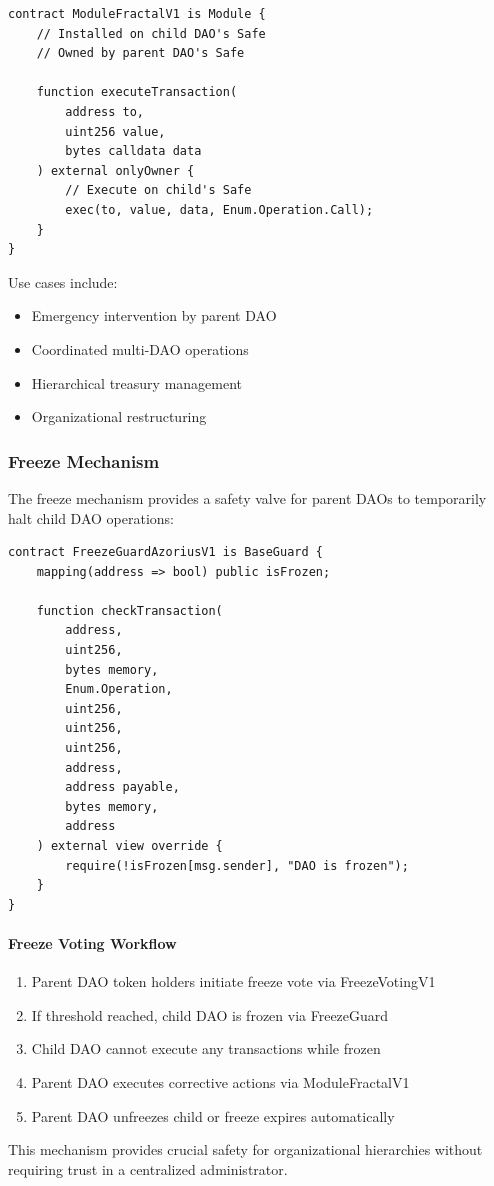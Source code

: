 \begin{lstlisting}[caption=Parent-Child Relationship]
contract ModuleFractalV1 is Module {
    // Installed on child DAO's Safe
    // Owned by parent DAO's Safe

    function executeTransaction(
        address to,
        uint256 value,
        bytes calldata data
    ) external onlyOwner {
        // Execute on child's Safe
        exec(to, value, data, Enum.Operation.Call);
    }
}
\end{lstlisting}

Use cases include:
\begin{itemize}
    \item Emergency intervention by parent DAO
    \item Coordinated multi-DAO operations
    \item Hierarchical treasury management
    \item Organizational restructuring
\end{itemize}

\subsubsection{Freeze Mechanism}

The freeze mechanism provides a safety valve for parent DAOs to temporarily halt child DAO operations:

\begin{lstlisting}[caption=Freeze Guard Architecture]
contract FreezeGuardAzoriusV1 is BaseGuard {
    mapping(address => bool) public isFrozen;

    function checkTransaction(
        address,
        uint256,
        bytes memory,
        Enum.Operation,
        uint256,
        uint256,
        uint256,
        address,
        address payable,
        bytes memory,
        address
    ) external view override {
        require(!isFrozen[msg.sender], "DAO is frozen");
    }
}
\end{lstlisting}

\paragraph{Freeze Voting Workflow}

\begin{enumerate}
    \item Parent DAO token holders initiate freeze vote via FreezeVotingV1
    \item If threshold reached, child DAO is frozen via FreezeGuard
    \item Child DAO cannot execute any transactions while frozen
    \item Parent DAO executes corrective actions via ModuleFractalV1
    \item Parent DAO unfreezes child or freeze expires automatically
\end{enumerate}

This mechanism provides crucial safety for organizational hierarchies without requiring trust in a centralized administrator.

